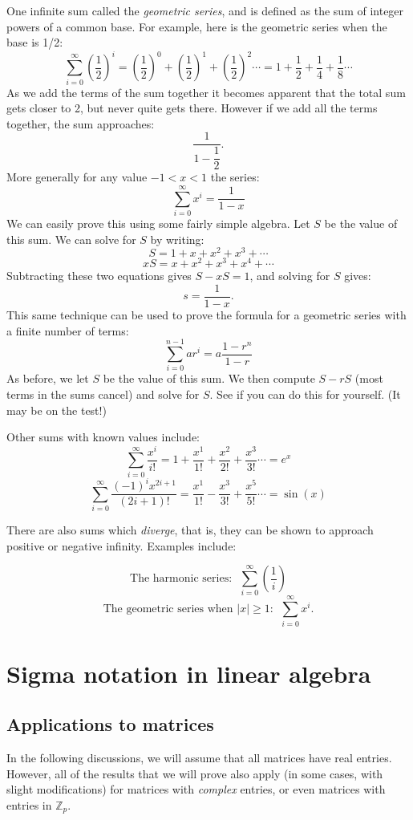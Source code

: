 One infinite sum called the \emph{geometric series}, and is defined as the sum of integer powers of a common base.  For example, here is the geometric series when the base is 1/2:
\[\sum_{i=0}^{\infty}({\dfrac{1}{2}})^i=({\dfrac{1}{2}})^0+({\dfrac{1}{2}})^1+({\dfrac{1}{2}})^2\cdots = 1 + {\dfrac{1}{2}} + {\dfrac{1}{4}} + {\dfrac{1}{8}}\cdots\]
As we add the terms of the sum together it becomes apparent that the total sum gets closer to 2, but never quite gets there.  However if we add all the terms together, the sum approaches:
\[\dfrac{1}{1-\dfrac{1}{2}}.\]
More generally for any value $-1<x<1$ the series:
\[\sum_{i=0}^{\infty}x^i = \dfrac{1}{1-x}\]
We can easily prove this using some fairly simple algebra.  Let $S$ be the value of this sum.  We can solve for $S$  by writing:
 \[S=1+x+x^2+x^3+ \cdots \]
\[xS=x+x^2+x^3+x^4+ \cdots \] 
Subtracting these two equations gives $S-xS=1$, and solving for $S$ gives:
\[s=\dfrac{1}{1-x}. \]
This same technique can be used to prove the formula for a geometric series with a finite number of terms:
\[ \sum_{i=0}^{n-1} ar^i = a \dfrac{1-r^n}{1-r} \]
As before, we let $S$ be the value of this sum. We then compute $S - rS$ (most terms in the sums cancel) and solve for $S$.  See if you can do this for yourself.  (It may be on the test!)

Other sums with known values include:
\[\sum_{i=0}^{\infty}\dfrac{x^i}{i!} =1+\dfrac{x^1}{1!}+\dfrac{x^2}{2!}+\dfrac{x^3}{3!} \cdots=e^x\]
\[\sum_{i=0}^{\infty}\dfrac{(-1)^i x^{2i+1}}{(2i+1)!} = \dfrac{x^1}{1!}-\dfrac{x^3}{3!}+\dfrac{x^5}{5!}\cdots= \sin(x)\]

There are also sums which \emph{diverge}, that is, they can be shown to approach positive or negative infinity. Examples include:

\[\text{The harmonic series:~~}\sum_{i=0}^{\infty}\left(\dfrac{1}{i} \right) \]
\[\text{The geometric series when~} |x| \ge 1: ~~\sum_{i=0}^{\infty} x^i. \]

\section{Sigma notation in linear algebra}

\subsection{Applications to matrices}

In the following discussions, we will assume that all matrices have real entries.  However, all of the results that we will prove also apply (in some cases, with slight modifications)  for matrices with \emph{complex} entries, or even matrices with entries in $\mathbb{Z}_p$.

